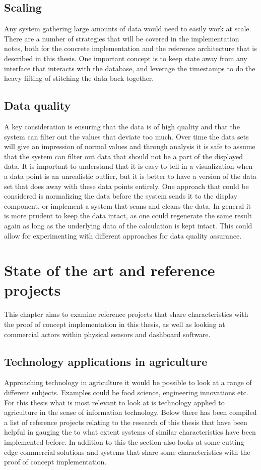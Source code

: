 \documentclass[]{uiophd}
\begin{document}
\section{Scaling}
Any system gathering large amounts of data would need to easily work at scale. There are a number of strategies that will be covered in the implementation notes, both for the concrete implementation and the reference architecture that is described in this thesis. One important concept is to keep state away from any interface that interacts with the database, and leverage the timestamps to do the heavy lifting of stitching the data back together.
\section{Data quality}
A key consideration is ensuring that the data is of high quality and that the system can filter out the values that deviate too much. Over time the data sets will give an impression of normal values and through analysis it is safe to assume that the system can filter out data that should not be a part of the displayed data. It is important to understand that it is easy to tell in a visualization when a data point is an unrealistic outlier, but it is better to have a version of the data set that does away with these data points entirely. One approach that could be considered is normalizing the data before the system sends it to the display component, or implement a system that scans and cleans the data. In general it is more prudent to keep the data intact, as one could regenerate the same result again as long as the underlying data of the calculation is kept intact. This could allow for experimenting with different approaches for data quality assurance.

\chapter{State of the art and reference projects}
This chapter aims to examine reference projects that share characteristics with the proof of concept implementation in this thesis, as well as looking at commercial actors within physical sensors and dashboard software.
\section{Technology applications in agriculture}
Approaching technology in agriculture it would be possible to look at a range of different subjects. Examples could be food science, engineering innovations etc. For this thesis what is most relevant to look at is technology applied to agriculture in the sense of information technology. Below there has been compiled a list of reference projects relating to the research of this thesis that have been helpful in gauging the to what extent systems of similar characteristics have been implemented before. In addition to this the section also looks at some cutting edge commercial solutions and systems that share some characteristics with the proof of concept implementation.
\end{document}
